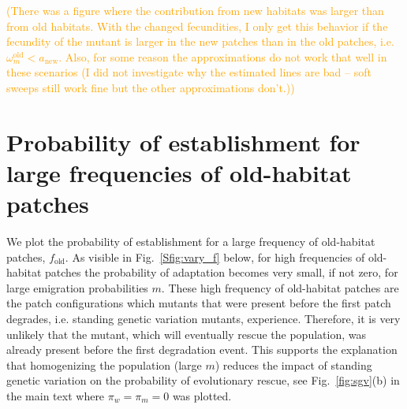 \documentclass[a4paper,11pt]{scrartcl}
\newcommand{\pete}[1]{\textcolor{orange}{(#1)}}
\newcommand{\chg}[1]{\textcolor{change}{#1}}
\begin{document}

\pete{There was a figure where the contribution from new habitats was larger than from old habitats. With the changed fecundities, I only get this behavior if the fecundity of the mutant is larger in the new patches than in the old patches, i.e. $\omega^\text{old}_m < a_{\text{new}}$. Also, for some reason the approximations do not work that well in these scenarios (I did not investigate why the estimated lines are bad -- soft sweeps still work fine but the other approximations don't.)}

\newpage
\section{Probability of establishment for large frequencies of old-habitat patches}
\chg{We plot the probability of establishment for a large frequency of old-habitat patches, $f_{\text{old}}$. As visible in Fig.~\ref{Sfig:vary_f} below, for high frequencies of old-habitat patches the probability of adaptation becomes very small, if not zero, for large emigration probabilities $m$. These high frequency of old-habitat patches are the patch configurations which mutants that were present before the first patch degrades, i.e. standing genetic variation mutants, experience. Therefore, it is very unlikely that the mutant, which will eventually rescue the population, was already present before the first degradation event.} This supports the explanation that homogenizing the population (large $m$) reduces the impact of standing genetic variation on the probability of evolutionary rescue, see Fig.~\ref{fig:sgv}(b) in the main text where $\pi_w=\pi_m=0$ was plotted.
\end{document}
